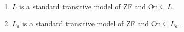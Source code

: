 \begin{enumerate}
\item $L$ is a standard transitive model of ZF and $\mathrm{On} \subseteq L$.
\item $L_a$ is a standard transitive model of ZF and $\mathrm{On} \subseteq L_a$.
\end{enumerate}
